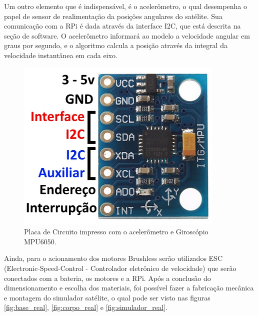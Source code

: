 Um outro elemento que é indispensável, é o acelerômetro, o qual desempenha o papel de sensor de realimentação da posições angulares do satélite. Sua comunicação com a RPi é dada através da interface I2C, que está descrita na seção de software. O acelerômetro informará ao modelo a velocidade angular em graus por segundo, e o algoritmo calcula a posição através da integral da velocidade instantânea em cada eixo.

\begin{figure}[H]
  \caption{Placa de Circuito impresso com o acelerômetro e Giroscópio MPU6050.}
  \begin{center}
      \includegraphics[scale=.4]{metodologia/img/pci_acelerometro_calache_p22}
  \end{center}
  \label{fig:pci_acelerometro_calache_p22}
\end{figure}

Ainda, para o acionamento dos motores Brushless serão utilizados ESC (Electronic-Speed-Control - Controlador eletrônico de velocidade) que serão conectados com a bateria, os motores e a RPi. Após a conclusão do dimensionamento e escolha dos materiais, foi possível fazer a fabricação mecânica e montagem do simulador satélite, o qual pode ser visto nas figuras \ref{fig:base_real}, \ref{fig:corpo_real} e \ref{fig:simulador_real}.


